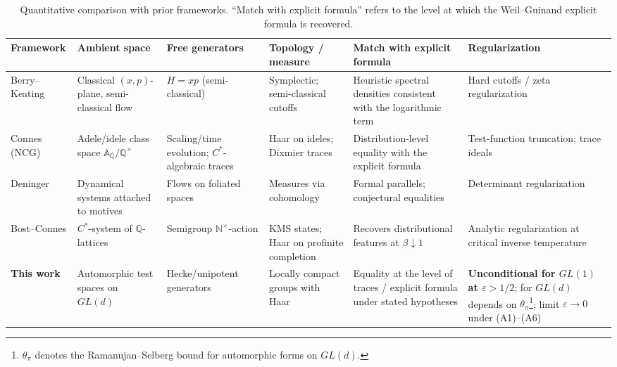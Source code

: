 ﻿\documentclass[12pt,a4paper]{article}
\theoremstyle{definition}
\theoremstyle{remark}
\begin{document}
\begin{table}[t]
\caption{Quantitative comparison with prior frameworks. ``Match with explicit formula'' refers to the level at which the Weil--Guinand explicit formula is recovered.}
\label{tab:comparison}
\scriptsize
\setlength{\tabcolsep}{4pt}
\renewcommand{\arraystretch}{1.2}
\begin{tabularx}{\textwidth}{l l l l l l}
\toprule
\textbf{Framework} & \textbf{Ambient space} & \textbf{Free generators} & \textbf{Topology / measure} & \textbf{Match with explicit formula} & \textbf{Regularization} \\
\midrule
Berry--Keating \cite{Berry1999,BerryKeating1999} & Classical $(x,p)$-plane, semi-classical flow & $H= xp$ (semi-classical) & Symplectic; semi-classical cutoffs & Heuristic spectral densities consistent with the logarithmic term & Hard cutoffs / zeta regularization \\
Connes (NCG) \cite{Connes1996,Connes1999} & Adele/idele class space $\mathbb{A}_\mathbb{Q}/\mathbb{Q}^\times$ & Scaling/time evolution; $C^*$-algebraic traces & Haar on ideles; Dixmier traces & Distribution-level equality with the explicit formula & Test-function truncation; trace ideals \\
Deninger \cite{Deninger1998} & Dynamical systems attached to motives & Flows on foliated spaces & Measures via cohomology & Formal parallels; conjectural equalities & Determinant regularization \\
Bost--Connes \cite{BostConnes1995} & $C^*$-system of $\mathbb{Q}$-lattices & Semigroup $\mathbb{N}^{\times}$-action & KMS states; Haar on profinite completion & Recovers distributional features at $\beta\downarrow 1$ & Analytic regularization at critical inverse temperature \\
\textbf{This work} & Automorphic test spaces on $GL(d)$ & Hecke/unipotent generators & Locally compact groups with Haar & Equality at the level of traces / explicit formula under stated hypotheses & \textbf{Unconditional for $GL(1)$ at $\varepsilon>1/2$}; for $GL(d)$ depends on $\theta_\pi$\footnote{$\theta_\pi$ denotes the Ramanujan--Selberg bound for automorphic forms on $GL(d)$.}; limit $\varepsilon\to 0$ under (A1)--(A6) \\
\bottomrule
\end{tabularx}
\end{table}
\end{document}

